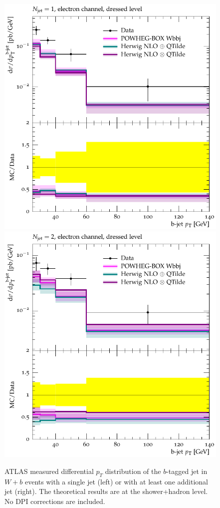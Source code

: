 \documentclass[11pt]{cernrep}
\newcommand{\pt}{\ensuremath{p_{T}}\xspace}
\begin{document}
\begin{figure}[htbp]
\begin{center}
   \includegraphics[scale=0.65]{figs/wbb/compared/d02-x01-y01.pdf}
   \includegraphics[scale=0.65]{figs/wbb/compared/d02-x02-y01.pdf}
\end{center}
\caption{ATLAS measured differential \pt distribution of the
  $b$-tagged jet in $W+b$ events with a single jet (left) or with at
  least one additional jet (right). The theoretical results are at the
  shower+hadron level. No DPI corrections are included.}
\label{fig:wbb-pt}
\end{figure}
\end{document}

